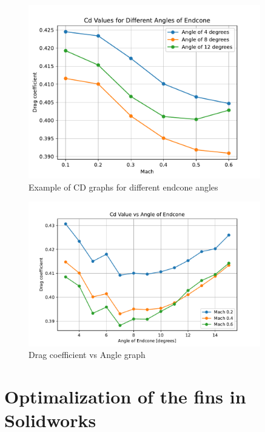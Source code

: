 \documentclass{article}
\begin{document}
\begin{figure}[H]
    \centering
    \includegraphics[width=0.9\textwidth]{../data/R6-Parametric-Endcone/ExampleCdGraphs.pdf}
    \caption{Example of CD graphs for different endcone angles}
\end{figure}


\begin{figure}[H]
    \centering
    \includegraphics[width=0.9\textwidth]{../data/R6-Parametric-Endcone/CdVsAngle.pdf}
    \caption{Drag coefficient vs Angle graph}
    \label{fig:CdVsAngleEndcone}
\end{figure}



\section{Optimalization of the fins in Solidworks}
\end{document}
